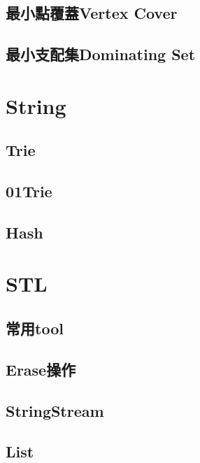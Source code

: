 \subsection{最小點覆蓋Vertex Cover}


\subsection{最小支配集Dominating Set}


\section{String}

\subsection{Trie}


\subsection{01Trie}


\subsection{Hash}


\section{STL}

\subsection{常用tool}


\subsection{Erase操作}


\subsection{StringStream}


\subsection{List}


